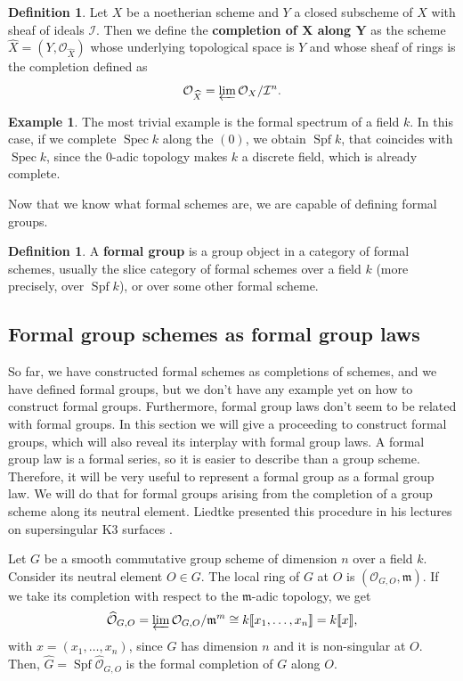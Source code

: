 \documentclass{report}
\DeclareMathOperator{\Spf}{Spf}
\DeclareMathOperator{\Spec}{Spec}
\theoremstyle{definition}
\newtheorem{definition}[equation]{Definition}
\newtheorem{example}[equation]{Example}
\begin{document}
\begin{definition}
Let $X$ be a noetherian scheme and $Y$ a closed subscheme of $X$ with sheaf of ideals $\mathcal{I}$. Then we define the \textbf{completion of $\boldsymbol{X}$ along $\boldsymbol{Y}$} as the scheme $\widehat{X}=(Y,\mathcal{O}_{\widehat{X}})$ whose underlying topological space is $Y$ and whose sheaf of rings is the completion defined as
\[\mathcal{O}_{\widehat{X}}=\varprojlim\mathcal{O}_X/\mathcal{I}^n.\]
\end{definition}

\begin{example}
The most trivial example is the formal spectrum of a field $k$. In this case, if we complete $\Spec k$ along the $(0)$, we obtain $\Spf k$, that coincides with $\Spec k$, since the $0$-adic topology makes $k$ a discrete field, which is already complete.
\end{example}

Now that we know what formal schemes are, we are capable of defining formal groups.

\begin{definition}
A \textbf{formal group} is a group object in a category of formal schemes, usually the slice category of formal schemes over a field $k$ (more precisely, over $\Spf k$), or over some other formal scheme.
\end{definition}

\subsection{Formal group schemes as formal group laws}

So far, we have constructed formal schemes as completions of schemes, and we have defined formal groups, but we don't have any example yet on how to construct formal groups. Furthermore, formal group laws don't seem to be related with formal groups. In this section we will give a proceeding to construct formal groups, which will also reveal its interplay with formal group laws. A formal group law is a formal series, so it is easier to describe than a group scheme. Therefore, it will be very useful to represent a formal group as a formal group law. We will do that for formal groups arising from the completion of a group scheme along its neutral element. Liedtke presented this procedure in his lectures on supersingular K3 surfaces \cite[Example~6.10]{liedtke2016lectures}.

Let $G$ be a smooth commutative group scheme of dimension $n$ over a field $k$. Consider its neutral element $O\in G$. The local ring of $G$ at $O$ is $(\mathcal{O}_{G,O},\mathfrak{m})$. If we take its completion with respect to the $\mathfrak{m}$-adic topology, we get
\[\widehat{\mathcal{O}}_{G,O}=\varprojlim\mathcal{O}_{G,O}/\mathfrak{m}^m\cong k\llbracket x_1,\ldots,x_n\rrbracket=k\llbracket x\rrbracket,\]
with $x=(x_1,\ldots,x_n)$, since $G$ has dimension $n$ and it is non-singular at $O$. Then, $\widehat{G}=\Spf\widehat{\mathcal{O}}_{G,O}$ is the formal completion of $G$ along $O$.
\end{document}
